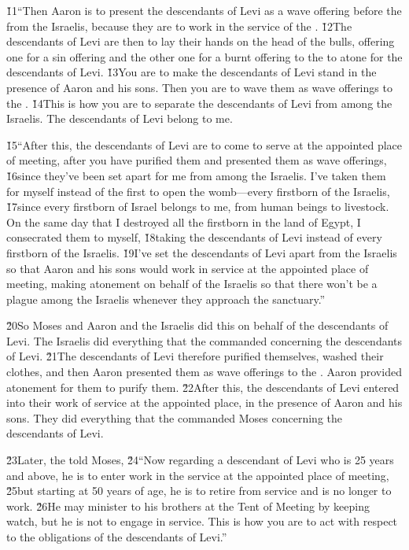 \v{11}``Then Aaron is to present the descendants of Levi as a wave offering before the  from the Israelis, because they are to work in the service of the . \v{12}The descendants of Levi are then to lay their hands on the head of the bulls, offering one for a sin offering and the other one for a burnt offering to the  to atone for the descendants of Levi. \v{13}You are to make the descendants of Levi stand in the presence of Aaron and his sons. Then you are to wave them as wave offerings to the . \v{14}This is how you are to separate the descendants of Levi from among the Israelis. The descendants of Levi belong to me.

\v{15}``After this, the descendants of Levi are to come to serve at the appointed place of meeting, after you have purified them and presented them as wave offerings, \v{16}since they've been set apart for me from among the Israelis. I've taken them for myself instead of the first to open the womb---every firstborn of the Israelis, \v{17}since every firstborn of Israel belongs to me, from human beings to livestock. On the same day that I destroyed all the firstborn in the land of Egypt, I consecrated them to myself, \v{18}taking the descendants of Levi instead of every firstborn of the Israelis. \v{19}I've set the descendants of Levi apart from the Israelis so that Aaron and his sons would work in service at the appointed place of meeting, making atonement on behalf of the Israelis so that there won't be a plague among the Israelis whenever they approach the sanctuary.''

\v{20}So Moses and Aaron and the Israelis did this on behalf of the descendants of Levi. The Israelis did everything that the  commanded concerning the descendants of Levi. \v{21}The descendants of Levi therefore purified themselves, washed their clothes, and then Aaron presented them as wave offerings to the . Aaron provided atonement for them to purify them. \v{22}After this, the descendants of Levi entered into their work of service at the appointed place, in the presence of Aaron and his sons. They did everything that the  commanded Moses concerning the descendants of Levi.

\v{23}Later, the  told Moses, \v{24}``Now regarding a descendant of Levi who is 25 years and above, he is to enter work in the service at the appointed place of meeting, \v{25}but starting at 50 years of age, he is to retire from service and is no longer to work. \v{26}He may minister to his brothers at the Tent of Meeting by keeping watch, but he is not to engage in service. This is how you are to act with respect to the obligations of the descendants of Levi.''

